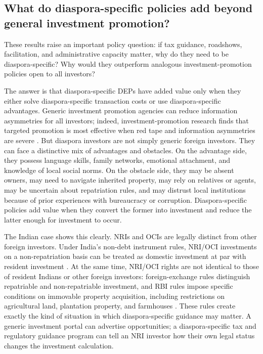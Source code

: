 \documentclass[12pt]{article}
\let\oldsubsection\subsection
\renewcommand{\subsection}{\FloatBarrier\oldsubsection}
\begin{document}
\subsection{What do diaspora-specific policies add beyond general investment promotion?}

These results raise an important policy question: if tax guidance, roadshows, facilitation, and administrative capacity matter, why do they need to be diaspora-specific? Why would they outperform analogous investment-promotion policies open to all investors?

The answer is that diaspora-specific DEPs have added value only when they either solve diaspora-specific transaction costs or use diaspora-specific advantages. Generic investment promotion agencies can reduce information asymmetries for all investors; indeed, investment-promotion research finds that targeted promotion is most effective when red tape and information asymmetries are severe \citep{harding_roll_2011}. But diaspora investors are not simply generic foreign investors. They can face a distinctive mix of advantages and obstacles. On the advantage side, they possess language skills, family networks, emotional attachment, and knowledge of local social norms. On the obstacle side, they may be absent owners, may need to navigate inherited property, may rely on relatives or agents, may be uncertain about repatriation rules, and may distrust local institutions because of prior experiences with bureaucracy or corruption. Diaspora-specific policies add value when they convert the former into investment and reduce the latter enough for investment to occur.

The Indian case shows this clearly. NRIs and OCIs are legally distinct from other foreign investors. Under India's non-debt instrument rules, NRI/OCI investments on a non-repatriation basis can be treated as domestic investment at par with resident investment \citep{unctad_india_nodate}. At the same time, NRI/OCI rights are not identical to those of resident Indians or other foreign investors: foreign-exchange rules distinguish repatriable and non-repatriable investment, and RBI rules impose specific conditions on immovable property acquisition, including restrictions on agricultural land, plantation property, and farmhouses \citep{reserve_bank_of_india_reserve_nodate}. These rules create exactly the kind of situation in which diaspora-specific guidance may matter. A generic investment portal can advertise opportunities; a diaspora-specific tax and regulatory guidance program can tell an NRI investor how their own legal status changes the investment calculation.
\end{document}
